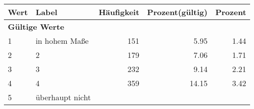      \begin{longtable}{lXrrr}
     \toprule
     \textbf{Wert} & \textbf{Label} & \textbf{Häufigkeit} & \textbf{Prozent(gültig)} & \textbf{Prozent} \\
     \endhead
     \midrule
     \multicolumn{5}{l}{\textbf{Gültige Werte}}\\

     1 &
     \multicolumn{1}{X}{ in hohem Maße   } &


       \num{151} &
       \num[round-mode=places,round-precision=2]{5,95} &
         \num[round-mode=places,round-precision=2]{1,44} \\

     2 &
     \multicolumn{1}{X}{ 2   } &


       \num{179} &
       \num[round-mode=places,round-precision=2]{7,06} &
         \num[round-mode=places,round-precision=2]{1,71} \\

     3 &
     \multicolumn{1}{X}{ 3   } &


       \num{232} &
       \num[round-mode=places,round-precision=2]{9,14} &
         \num[round-mode=places,round-precision=2]{2,21} \\

     4 &
     \multicolumn{1}{X}{ 4   } &


       \num{359} &
       \num[round-mode=places,round-precision=2]{14,15} &
         \num[round-mode=places,round-precision=2]{3,42} \\

     5 &
     \multicolumn{1}{X}{ überhaupt nicht   } &



\end{longtable}
